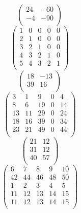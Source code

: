 \documentclass{fkssolpub}
\begin{document}
\begin{equation}
	\begin{pmatrix}
		24 & -60 \\
		-4 & -90 \\
	\end{pmatrix}
\end{equation}
\begin{equation}
	\begin{pmatrix}
		1 & 0 & 0 & 0 & 0 \\
		2 & 1 & 0 & 0 & 0 \\
		3 & 2 & 1 & 0 & 0 \\
		4 & 3 & 2 & 1 & 0 \\
		5 & 4 & 3 & 2 & 1 \\
	\end{pmatrix}
\end{equation}
\begin{equation}
	\begin{pmatrix}
		18 & -13 \\
		39 & 16  \\
	\end{pmatrix}
\end{equation}
\begin{equation}
	\begin{pmatrix}
		3  & 1  & 9  & 0 & 4  \\
		8  & 6  & 19 & 0 & 14 \\
		13 & 11 & 29 & 0 & 24 \\
		18 & 16 & 39 & 0 & 34 \\
		23 & 21 & 49 & 0 & 44 \\
	\end{pmatrix}
\end{equation}
\begin{equation}
	\begin{pmatrix}
		21 & 12 \\
		31 & 12 \\
		40 & 57 \\
	\end{pmatrix}
\end{equation}
\begin{equation}
	\begin{pmatrix}
		6  & 7  & 8  & 9  & 10 \\
		42 & 44 & 46 & 48 & 50 \\
		1  & 2  & 3  & 4  & 5  \\
		11 & 12 & 13 & 14 & 15 \\
		11 & 12 & 13 & 14 & 15 \\
	\end{pmatrix}
\end{equation}
\end{document}
